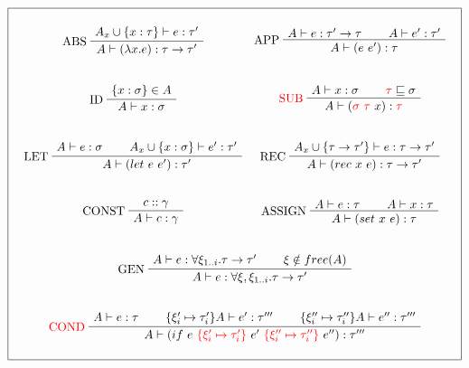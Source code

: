 \documentclass[a4paper]{report}
\newcommand{\lang}[0]{\mathcal{L}}
\newcommand{\locus}[1]{\widetilde{#1}}
\newcommand{\ax}[1]%
{\AxiomC{$#1$}}
\newcommand{\unc}[1]%
{\UnaryInfC{$#1$}}
\newcommand{\bic}[1]%
{\BinaryInfC{$#1$}}
\newcommand{\tric}[1]%
{\TrinaryInfC{$#1$}}
\newcommand{\drule}%
{\DisplayProof}
\begin{document}
\begin{table}
\centering
$$\boxed{\begin{array}{c}\begin{array}{cc}
\\
\ax{A_x\cup\{x:\tau\}\vdash e:\tau'}
\LeftLabel{ABS}
\unc{A\vdash(\lambda x.e):\tau\to\tau'}
\drule
&
\ax{A\vdash e:\tau'\to\tau}
\ax{A\vdash e':\tau'}
\LeftLabel{APP}
\bic{A\vdash (e\ e'):\tau}
\drule
\\\\\\
\ax{\{x:\sigma\}\in A}
\LeftLabel{ID}
\unc{A\vdash x:\sigma}
\drule
&
\ax{A\vdash x:\sigma}
\ax{\textcolor{red}{\tau}\sqsubseteq\sigma}
\LeftLabel{\textcolor{red}{SUB}}
\bic{A\vdash (\textcolor{red}{\sigma}\ \textcolor{red}{\tau}\ x):\textcolor{red}{\tau}}
\drule
\\\\\\
\ax{A\vdash e:\sigma}
\ax{A_x\cup\{x:\sigma\}\vdash e':\tau'}
\LeftLabel{LET}
\bic{A\vdash (let\ e\ e'):\tau'}
\drule
&
\ax{A_x\cup\{\tau\to\tau'\}\vdash e:\tau\to\tau'}
\LeftLabel{REC}
\unc{A\vdash (rec\ x\ e):\tau\to\tau'}
\drule
\\\\\\
\ax{c::\gamma}
\LeftLabel{CONST}
\unc{A\vdash c:\gamma}
\drule
&
\ax{A\vdash e:\tau}
\ax{A\vdash x:\tau}
\LeftLabel{ASSIGN}
\bic{A\vdash (set\ x\ e):\tau}
\drule
\end{array}
\\\\\\
\ax{A\vdash e:\forall\xi_{1..i}.\tau\to\tau'}
\ax{\xi\notin free(A)}
\LeftLabel{GEN}
\bic{A\vdash e:\forall\xi,\xi_{1..i}.\tau\to\tau'}
\drule
\\\\\\
\ax{A\vdash e:\tau}
\ax{\{\xi_i'\mapsto\tau_i'\}A\vdash e':\tau'''}
\ax{\{\xi_i''\mapsto\tau_i''\}A\vdash e'':\tau'''}
\LeftLabel{\textcolor{red}{COND}}
\tric{A\vdash (if\ e\ \textcolor{red}{\{\xi_i'\mapsto\tau_i'\}}\ e'\ \textcolor{red}{\{\xi_i''\mapsto\tau_i''\}}\ e''):\tau'''}
\drule
\\\\
\end{array}
}$$
\caption{The $\locus\lang$ type system.}
\end{table}
\end{document}
